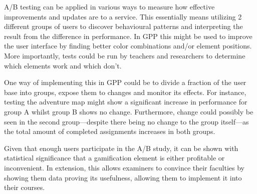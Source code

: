 A/B testing can be applied in various ways to measure how effective improvements and updates are to a service. This essentially means utilizing 2 different groups of users to discover behavioural patterns and interpreting the result from the difference in performance. In GPP this might be used to improve the user interface by finding better color combinations and/or element positions. More importantly, tests could be run by teachers and researchers to determine which elements work and which don't.

One way of implementing this in GPP could be to divide a fraction of the user base into groups, expose them to changes and monitor its effects. For instance, testing the adventure map might show a significant increase in performance for group A whilst group B shows no change. Furthermore, change could possibly be seen in the second group---despite there being no change to the group itself---as the total amount of completed assignments increases in both groups.

Given that enough users participate in the A/B study, it can be shown with statistical significance that a gamification element is either profitable or inconvenient. In extension, this allows examiners to convince their faculties by showing them data proving its usefulness, allowing them to implement it into their courses.
